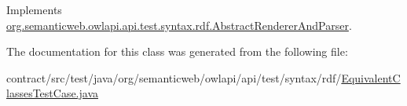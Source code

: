 Implements \hyperlink{classorg_1_1semanticweb_1_1owlapi_1_1api_1_1test_1_1syntax_1_1rdf_1_1_abstract_renderer_and_parser_a6eb3d4cdc99bab1338cfad6899390e9f}{org.\-semanticweb.\-owlapi.\-api.\-test.\-syntax.\-rdf.\-Abstract\-Renderer\-And\-Parser}.



The documentation for this class was generated from the following file\-:\begin{DoxyCompactItemize}
\item 
contract/src/test/java/org/semanticweb/owlapi/api/test/syntax/rdf/\hyperlink{_equivalent_classes_test_case_8java}{Equivalent\-Classes\-Test\-Case.\-java}\end{DoxyCompactItemize}
